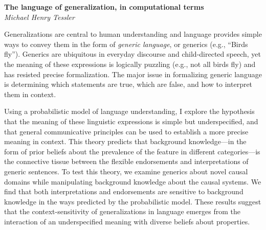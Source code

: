 \documentclass[10pt,letterpaper]{article}
\begin{document}
\noindent\textbf{The language of generalization, in computational terms} \\
\noindent\emph{Michael Henry Tessler}


Generalizations are central to human understanding and language provides simple ways to convey them in the form of \emph{generic language}, or generics (e.g., ``Birds fly''). 
Generics are ubiquitous in everyday discourse and child-directed speech, yet the meaning of these expressions is logically puzzling (e.g., not all birds fly) and has resisted precise formalization. 
The major issue in formalizing generic language is determining which statements are true, which are false, and how to interpret them in context. 

Using a probabilistic model of language understanding, I explore the hypothesis that the meaning of these linguistic expressions is simple but underspecified, and that general communicative principles can be used to establish a more precise meaning in context. 
This theory predicts that background knowledge---in the form of prior beliefs about the prevalence of the feature in different categories---is the connective tissue between the flexible endorsements and interpretations of generic sentences. 
To test this theory, we examine generics about novel causal domains while manipulating background knowledge about the causal systems. 
We find that both interpretations and endorsements are sensitive to background knowledge in the ways predicted by the probabilistic model. 
These results suggest that the context-sensitivity of generalizations in language emerges from the interaction of an underspecified meaning with diverse beliefs about properties.

\end{document}
